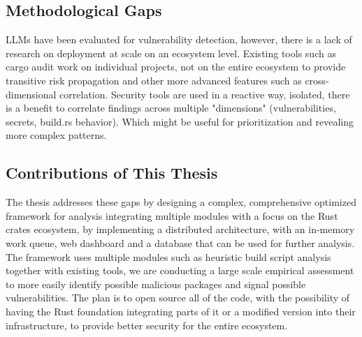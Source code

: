 \subsection{Methodological Gaps}\label{sect:methodological-gaps}

LLMs have been evaluated for vulnerability detection, however, there is a lack of research on deployment at scale on an ecosystem level.
Existing tools such as cargo audit work on individual projects, not on the entire ecosystem to provide transitive risk propagation and other more advanced features such as cross-dimensional correlation.
Security tools are used in a reactive way, isolated, there is a benefit to correlate findings across multiple "dimensions" (vulnerabilities, secrets, build.rs behavior). Which might be useful for prioritization and revealing more complex patterns.

\subsection{Contributions of This Thesis}\label{sect:contributions-thesis}

The thesis addresses these gaps by designing a complex, comprehensive optimized framework for analysis integrating multiple modules with a focus on the Rust crates ecosystem, by implementing a distributed architecture, with an in-memory work queue, web dashboard and a database that can be used for further analysis.
The framework uses multiple modules such as heuristic build script analysis together with existing tools, we are conducting a large scale empirical assessment to more easily identify possible malicious packages and signal possible vulnerabilities.
The plan is to open source all of the code, with the possibility of having the Rust foundation integrating parts of it or a modified version into their infrastructure, to provide better security for the entire ecosystem.
